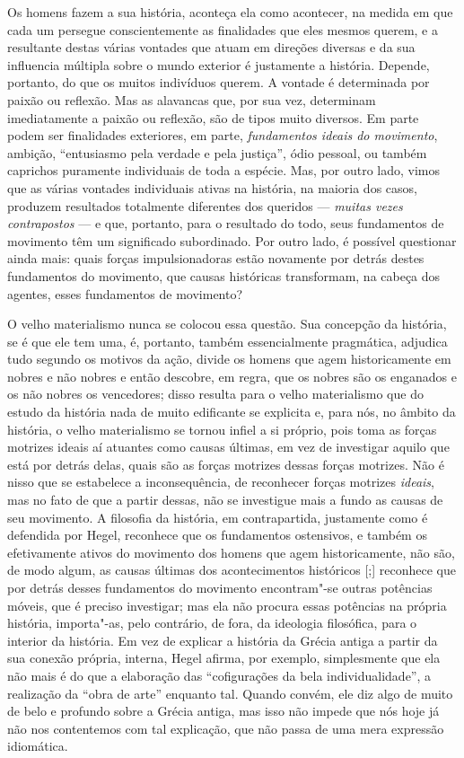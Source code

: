Os homens fazem a sua história, aconteça ela como acontecer, na medida
em que cada um persegue conscientemente as finalidades que eles mesmos
querem, e a resultante destas várias vontades que atuam em direções
diversas e da sua influencia múltipla sobre o mundo exterior é
justamente a história. Depende, portanto, do que os muitos indivíduos
querem. A vontade é determinada por paixão ou reflexão. Mas as alavancas
que, por sua vez, determinam imediatamente a paixão ou reflexão, são de
tipos muito diversos. Em parte podem ser finalidades exteriores, em
parte, \emph{fundamentos ideais do movimento}, 
ambição, ``entusiasmo pela verdade e pela justiça'', ódio
pessoal, ou também caprichos puramente individuais de toda a espécie.
Mas, por outro lado, vimos que as várias vontades individuais ativas na
história, na maioria dos casos, produzem resultados totalmente
diferentes dos queridos --- \emph{muitas vezes contrapostos} --- e que,
portanto, para o resultado do todo, seus fundamentos de movimento têm um
significado subordinado. Por outro lado, é possível questionar ainda
mais: quais forças impulsionadoras estão novamente por detrás destes
fundamentos do movimento, que causas históricas transformam, na cabeça
dos agentes, esses fundamentos de movimento?

O velho materialismo nunca se colocou essa questão. Sua concepção da
história, se é que ele tem uma, é, portanto, também essencialmente
pragmática, adjudica tudo segundo os motivos da ação, divide os homens
que agem historicamente em nobres e não nobres e então descobre, em
regra, que os nobres são os enganados e os não
nobres os vencedores; disso resulta para o velho materialismo que do
estudo da história nada de muito edificante se explicita e, para nós, no
âmbito da história, o velho materialismo se tornou infiel a si próprio,
pois toma as forças motrizes ideais aí atuantes como causas últimas, em
vez de investigar aquilo que está por detrás delas, quais são as forças
motrizes dessas forças motrizes. Não é nisso que se estabelece a
inconsequência, de reconhecer forças motrizes \emph{ideais}, mas no fato
de que a partir dessas, não se investigue mais a fundo as causas de seu
movimento. A filosofia da história, em contrapartida, justamente como é
defendida
por Hegel,
reconhece que os fundamentos ostensivos, e também os efetivamente ativos
do movimento dos homens que agem historicamente, não são, de modo algum,
as causas últimas dos acontecimentos históricos {[};{]} reconhece que
por detrás desses fundamentos do movimento encontram"-se outras potências
móveis, que é preciso investigar; mas ela não procura 
essas potências na própria história, importa"-as, pelo contrário, de
fora, da ideologia filosófica, para o interior da história. Em vez de
explicar a história da Grécia antiga a partir da sua conexão própria,
interna, Hegel afirma,
por exemplo, simplesmente que ela não mais é do que a elaboração das
``cofigurações da bela individualidade'', a realização da ``obra de
arte'' enquanto tal. Quando convém, ele diz algo de muito de belo e
profundo sobre a Grécia antiga, mas isso não impede que nós hoje já não
nos contentemos com tal explicação, que não passa de uma mera expressão
idiomática.

